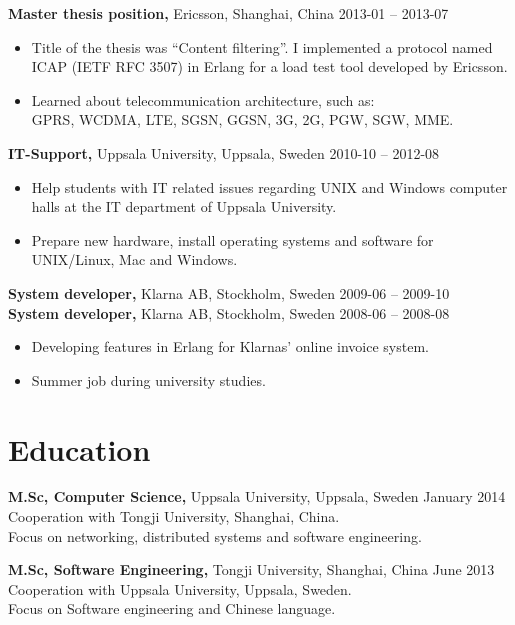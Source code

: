 \documentclass[margin]{res}
\begin{document}
\begin{resume}
{\bf Master thesis position,} Ericsson, Shanghai, China \hfill 2013-01 -- 2013-07
 \begin{itemize} \itemsep -2pt  %
 \item Title of the thesis was ``Content filtering''. I implemented a protocol named
   ICAP (IETF RFC 3507) in Erlang for a load test tool
   developed by Ericsson.
 \item Learned about telecommunication architecture, such as: \\
 GPRS, WCDMA, LTE, SGSN, GGSN, 3G, 2G, PGW, SGW, MME.
 \end{itemize}

{\bf IT-Support,} Uppsala University, Uppsala, Sweden \hfill 2010-10 -- 2012-08
 \begin{itemize} \itemsep -2pt  %
 \item Help students with IT related issues regarding UNIX and Windows
   computer halls at the IT department of Uppsala University.
 \item Prepare new hardware, install operating systems and software for UNIX/Linux, Mac and Windows.
 \end{itemize}

{\bf System developer,} Klarna AB, Stockholm, Sweden \hfill 2009-06 -- 2009-10\\
{\bf System developer,} Klarna AB, Stockholm, Sweden \hfill 2008-06 -- 2008-08
 \begin{itemize} \itemsep -2pt  %
 \item Developing features in Erlang for Klarnas' online invoice system.
 \item Summer job during university studies.
 \end{itemize}

\section{Education}
{\bf M.Sc,  Computer Science,} Uppsala University, Uppsala, Sweden \hfill January 2014 \\
Cooperation with Tongji University, Shanghai, China. \\
Focus on networking, distributed systems and software engineering.

{\bf M.Sc, Software Engineering,} Tongji University, Shanghai, China \hfill June 2013 \\
Cooperation with Uppsala University, Uppsala, Sweden.\\
Focus on Software engineering and Chinese language.


\end{resume}
\end{document}
